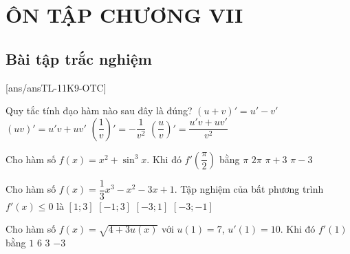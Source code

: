 \section*{ÔN TẬP CHƯƠNG VII}
\setcounter{subsection}{0}
\subsection{Bài tập trắc nghiệm}
[ans/ansTL-11K9-OTC]
\begin{ex}%
Quy tắc tính đạo hàm nào sau đây là đúng?
\choice 
{$(u+v)'=u'-v'$}
{\True $(uv)'=u'v+uv'$}
{ $\left(\dfrac{1}{v}\right)'=-\dfrac{1}{v^2}$}
{$\left(\dfrac{u}{v}\right)'=\dfrac{u'v+uv'}{v^2}$}
\end{ex}
\begin{ex}%
Cho hàm số $f(x)=x^2+\sin^3 x$. Khi đó $f'\left(\dfrac{\pi}{2}\right)$ bằng
\choice 
{\True $\pi$}
{ $2\pi$}
{$\pi +3$}
{$\pi -3$}
\end{ex}
\begin{ex}%
Cho hàm số $f(x)=\dfrac{1}{3}x^3-x^2-3x+1$. Tập nghiệm của bất phương trình $f'(x)\leq 0$ là
\choice
{$[1;3]$}
{\True $[-1;3]$}
{$[-3;1]$}
{$[-3;-1]$}
\end{ex}
\begin{ex}%
Cho hàm số $f(x)=\sqrt{4+3u(x)}$ với $u(1)=7$, $u'(1)=10$. Khi đó $f'(1)$ bằng
\choice 
{$1$}
{$6$}
{\True $3$}
{$-3$}
\end{ex}
